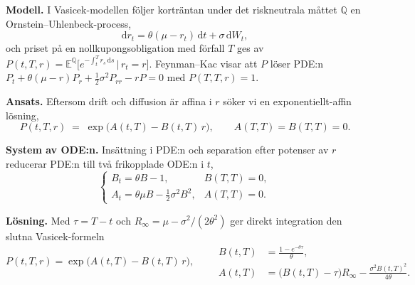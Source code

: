 \documentclass[11pt,a4paper]{article}
\newcommand{\dd}{\mathrm{d}}
\newcommand{\E}{\mathbb{E}}
\begin{document}
\textbf{Modell.} I Vasicek-modellen följer korträntan under det riskneutrala måttet $\mathbb{Q}$ en Ornstein--Uhlenbeck-process,
\[
    \dd r_t = \theta(\mu - r_t)\,\dd t + \sigma\,\dd W_t,
\]
och priset på en nollkupongsobligation med förfall $T$ ges av $P(t,T,r) = \E^{\mathbb{Q}}\!\bigl[e^{-\int_t^T r_s\,\dd s}\,\big|\,r_t = r\bigr]$. Feynman--Kac visar att $P$ löser PDE:n $P_t + \theta(\mu-r)P_r + \tfrac12\sigma^2 P_{rr} - rP = 0$ med $P(T,T,r)=1$.

\textbf{Ansats.} Eftersom drift och diffusion är affina i $r$ söker vi en exponentiellt-affin lösning,
\[
    P(t,T,r) \;=\; \exp\!\bigl(A(t,T) - B(t,T)\,r\bigr), \qquad A(T,T)=B(T,T)=0.
\]

\textbf{System av ODE:n.} Insättning i PDE:n och separation efter potenser av $r$ reducerar PDE:n till två frikopplade ODE:n i $t$,
\[
    \begin{cases}
        B_t = \theta B - 1, & B(T,T) = 0, \\[2pt]
        A_t = \theta\mu B - \tfrac12\sigma^2 B^2, & A(T,T) = 0.
    \end{cases}
\]

\textbf{Lösning.} Med $\tau = T-t$ och $R_\infty = \mu - \sigma^2/(2\theta^2)$ ger direkt integration den slutna Vasicek-formeln
\[
    P(t,T,r) = \exp\!\bigl(A(t,T) - B(t,T)\,r\bigr), \qquad
    \begin{aligned}
        B(t,T) &= \frac{1 - e^{-\theta\tau}}{\theta}, \\[2pt]
        A(t,T) &= \bigl(B(t,T) - \tau\bigr) R_\infty - \frac{\sigma^2 B(t,T)^2}{4\theta}.
    \end{aligned}
\]
\end{document}
